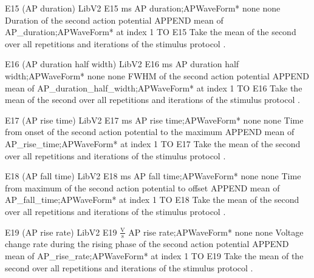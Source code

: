 \begin{efeature}
  {E15 (AP duration)}
  {LibV2}
  {E15}
  {ms}
  {AP duration;APWaveForm*}
  {none}
  {none}
  {Duration of the second action potential}
  {
  APPEND mean of AP\_duration;APWaveForm* at index 1 TO E15
  }
  Take the mean of the second  over all repetitions and iterations of the stimulus protocol .
  
\end{efeature}

\begin{efeature}
  {E16 (AP duration half width)}
  {LibV2}
  {E16}
  {ms}
  {AP duration half width;APWaveForm*}
  {none}
  {none}
  {FWHM of the second action potential}
  {
  APPEND mean of AP\_duration\_half\_width;APWaveForm* at index 1 TO E16
  }
  Take the mean of the second  over all repetitions and iterations of the stimulus protocol .
  
\end{efeature}

\begin{efeature}
  {E17 (AP rise time)}
  {LibV2}
  {E17}
  {ms}
  {AP rise time;APWaveForm*}
  {none}
  {none}
  {Time from onset of the second action potential to the maximum}
  {
  APPEND mean of AP\_rise\_time;APWaveForm* at index 1 TO E17
  }
  Take the mean of the second  over all repetitions and iterations of the stimulus protocol .
  
\end{efeature}

\begin{efeature}
  {E18 (AP fall time)}
  {LibV2}
  {E18}
  {ms}
  {AP fall time;APWaveForm*}
  {none}
  {none}
  {Time from maximum of the second action potential to offset}
  {
  APPEND mean of AP\_fall\_time;APWaveForm* at index 1 TO E18
  }
  Take the mean of the second  over all repetitions and iterations of the stimulus protocol .
  
\end{efeature}

\begin{efeature}
  {E19 (AP rise rate)}
  {LibV2}
  {E19}
  {$\frac{\mathrm{V}}{\mathrm{s}}$}
  {AP rise rate;APWaveForm*}
  {none}
  {none}
  {Voltage change rate during the rising phase of the second action potential}
  {
  APPEND mean of AP\_rise\_rate;APWaveForm* at index 1 TO E19
  }
  Take the mean of the second  over all repetitions and iterations of the stimulus protocol .
  
\end{efeature}

